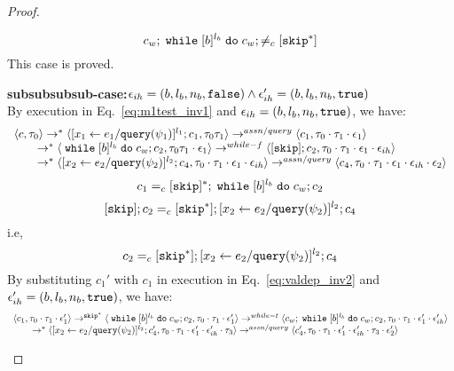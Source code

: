 \begin{proof}
\begin{case}
\begin{subcase}
\begin{subsubcase}
\begin{subproof}
\begin{enumerate}
\[
  c_w;\;\mathtt{while}\; [b]^{l_b} \;\mathtt{do}\; c_w; \neq_c [\mathtt{skip}^*]
\]
This case is proved.
%
 \end{enumerate}
%
\textbf{subsubsubsub-case:}$\mathtt{\epsilon}_{ih} = (b, l_b, n_b, \mathtt{false}) \land \mathtt{\epsilon}_{ih}' = (b, l_b, n_b, \mathtt{true})$
\\
By execution in Eq.~\ref{eq:m1test_inv1} and $\mathtt{\epsilon}_{ih} = (b, l_b, n_b, \mathtt{true})$, we have:
\[
  \begin{array}{l}   
  \langle {c}, \mathtt{\tau}_0 \rangle \rightarrow^{*} 
  \langle [\mathrel{ {x}_1 \leftarrow e_1 / {\tt query}(\psi_1) }]^{l_1} ; {c}_1, \mathtt{\tau}_0 \mathtt{\tau}_1 \rangle  
  \rightarrow^{assn/query}
  \langle c_1, \mathtt{\tau}_0 \cdot \mathtt{\tau}_1 \cdot \mathtt{\epsilon}_1 \rangle 
  \\
  \qquad \rightarrow^{*} 
  \langle \;\mathtt{while}\; [b]^{l_b} \;\mathtt{do}\; c_w;{c}_2, 
  \mathtt{\tau}_0 \mathtt{\tau}_1 \cdot \mathtt{\epsilon}_1 \rangle 
  \rightarrow^{while-f} 
  \langle [\mathtt{skip}]; c_2, \mathtt{\tau}_0 \cdot \mathtt{\tau}_1 \cdot \mathtt{\epsilon}_1 \cdot \mathtt{\epsilon}_{ih} \rangle 
  \\
  \qquad \rightarrow^{*} 
  \langle [\mathrel{ {x}_2 \leftarrow e_2 / {\tt query}(\psi_2) }]^{l_2};{c}_4, 
  \mathtt{\tau}_0 \cdot \mathtt{\tau}_1 \cdot \mathtt{\epsilon}_1 \cdot \mathtt{\epsilon}_{ih} \rangle 
  \rightarrow^{assn/query} 
  \langle {c}_4,  \mathtt{\tau}_0 \cdot \mathtt{\tau}_1 \cdot \mathtt{\epsilon}_1 \cdot \mathtt{\epsilon}_{ih} \cdot \mathtt{\epsilon}_2 \rangle 
  \end{array}
\]
%
\[
  c_1 =_c [\mathtt{skip}]{}^*; \;\mathtt{while}\; [b]^{l_b} \;\mathtt{do}\; c_w;{c}_2
\]
% 
\[
  [\mathtt{skip}]; c_2 =_c [\mathtt{skip}^*];[\mathrel{ {x}_2 \leftarrow e_2 / {\tt query}(\psi_2) }]^{l_2};{c}_4
\]
i.e,
\[
  c_2 =_c [\mathtt{skip}^*];[\mathrel{ {x}_2 \leftarrow e_2 / {\tt query}(\psi_2) }]^{l_2};{c}_4
\]
%
By substituting $c_1'$ with $c_1$ in execution in Eq.~\ref{eq:valdep_inv2} and $\mathtt{\epsilon}_{ih}' = (b, l_b, n_b, \mathtt{true})$, we have:
  \begin{equation}
  \label{eq:m1testwhile_inv2}
  \begin{array}{l}   
  \langle c_1, \mathtt{\tau}_0 \cdot \mathtt{\tau}_1 \cdot \mathtt{\epsilon}_1' \rangle 
  \rightarrow^{\mathtt{skip}^*} 
  \langle \;\mathtt{while}\; [b]^{l_b} \;\mathtt{do}\; c_w;{c}_2, \mathtt{\tau}_0 \cdot \mathtt{\tau}_1 \cdot \mathtt{\epsilon}_1' \rangle 
  \rightarrow^{while-t} 
  \langle c_w;\;\mathtt{while}\; [b]^{l_b} \;\mathtt{do}\; c_w;c_2, \mathtt{\tau}_0 \cdot \mathtt{\tau}_1 \cdot \mathtt{\epsilon}_1' \cdot \mathtt{\epsilon}_{ih}' \rangle 
  \\
  \qquad \rightarrow^{*} 
  \langle [\mathrel{ {x}_2 \leftarrow e_2 / {\tt query}(\psi_2) }]^{l_2};{c}_4', 
  \mathtt{\tau}_0 \cdot \mathtt{\tau}_1 \cdot \mathtt{\epsilon}_1' \cdot \mathtt{\epsilon}_{ih}' \cdot \mathtt{\tau}_3 \rangle
  \rightarrow^{assn/query} 
  \langle {c}_4',  \mathtt{\tau}_0 \cdot \mathtt{\tau}_1 \cdot \mathtt{\epsilon}_1' \cdot \mathtt{\epsilon}_{ih}' \cdot \mathtt{\tau}_3 \cdot \mathtt{\epsilon}_2' \rangle 
\end{array}
\end{equation}

\end{subproof}
\end{subsubcase}
\end{subcase}
\end{case}
\end{proof}
